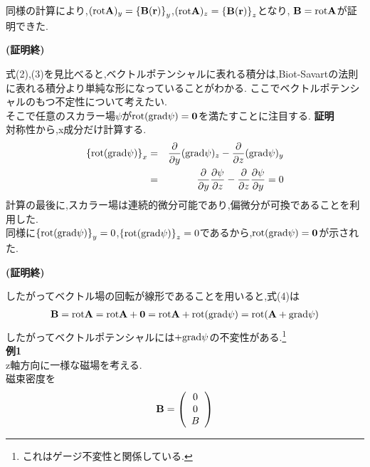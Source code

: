 \documentclass{jsarticle}
\begin{document}
同様の計算により,$({\rm rot}{\bf A})_y=\left\{ {\bf B}({\bf r}) \right\}_y$,$({\rm rot}{\bf A})_z=\left\{ {\bf B}({\bf r}) \right\}_z$となり,
${\bf B}={\rm rot}{\bf A}$が証明できた. \\
\begin{flushright}
{\bf (証明終)}
\end{flushright}
式(2),(3)を見比べると,ベクトルポテンシャルに表れる積分は,Biot-Savartの法則に表れる積分より単純な形になっていることがわかる.
ここでベクトルポテンシャルのもつ不定性について考えたい. \\
そこで任意のスカラー場$\psi$が${\rm rot}({\rm grad}\psi)={\bf 0}$を満たすことに注目する.
{\bf 証明} \\
対称性から,x成分だけ計算する. \\
\begin{eqnarray*}
\left\{ {\rm rot}({\rm grad}\psi) \right\}_x &=& \frac{\partial}{\partial y}({\rm grad}\psi)_z-\frac{\partial}{\partial z}({\rm grad}\psi)_y \\
&=& \frac{\partial}{\partial y} \frac{\partial \psi}{\partial z}- \frac{\partial}{\partial z} \frac{\partial \psi}{\partial y} = 0
\end{eqnarray*}
計算の最後に,スカラー場は連続的微分可能であり,偏微分が可換であることを利用した. \\
同様に$\left\{ {\rm rot}({\rm grad}\psi) \right\}_y=0$,$\left\{ {\rm rot}({\rm grad}\psi) \right\}_z=0$であるから,${\rm rot}({\rm grad}\psi)={\bf 0}$が示された. \\
\begin{flushright}
{\bf (証明終)}
\end{flushright}
したがってベクトル場の回転が線形であることを用いると,式(4)は
\begin{eqnarray*}
{\bf B}={\rm rot}{\bf A}={\rm rot}{\bf A} + {\bf 0} = {\rm rot}{\bf A}+{\rm rot}({\rm grad}\psi)={\rm rot}({\bf A}+{\rm grad}\psi)
\end{eqnarray*}
したがってベクトルポテンシャルには$+{\rm grad}\psi$の不変性がある.\footnote{これはゲージ不変性と関係している.} \\
{\bf 例1} \\
z軸方向に一様な磁場を考える. \\
磁束密度を
\begin{eqnarray*}
{\bf B}=
\left(
\begin{array}{c}
0 \\
0 \\
B
\end{array}
\right)
\end{eqnarray*}
\end{document}
